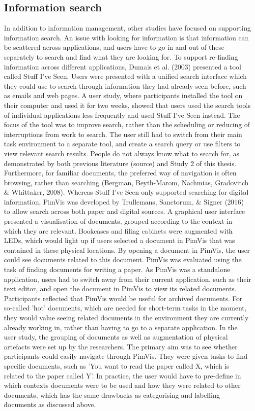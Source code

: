\subsection{Information search}
In addition to information management, other studies have focused on supporting information search. An issue with looking for information is that information can be scattered across applications, and users have to go in and out of these separately to search and find what they are looking for. To support re-finding information across different applications, Dumais et al. (2003) presented a tool called Stuff I've Seen. Users were presented with a unified search interface which they could use to search through information they had already seen before, such as emails and web pages. A user study, where participants installed the tool on their computer and used it for two weeks, showed that users used the search tools of individual applications less frequently and used Stuff I've Seen instead. The focus of the tool was to improve search, rather than the scheduling or reducing of interruptions from work to search. The user still had to switch from their main task environment to a separate tool, and create a search query or use filters to view relevant search results. People do not always know what to search for, as demonstrated by both previous literature (source) and Study 2 of this thesis. Furthermore, for familiar documents, the preferred way of navigation is often browsing, rather than searching (Bergman, Beyth-Marom, Nachmias, Gradovitch \& Whittaker, 2008).
Whereas Stuff I've Seen only supported searching for digital information, PimVis was developed by Trullemans, Sanctorum, \& Signer (2016) to allow search across both paper and digital sources. A graphical user interface presented a visualisation of documents, grouped according to the context in which they are relevant. Bookcases and filing cabinets were augmented with LEDs, which would light up if users selected a document in PimVis that was contained in these physical locations. By opening a document in PimVis, the user could see documents related to this document. PimVis was evaluated using the task of finding documents for writing a paper. As PimVis was a standalone application, users had to switch away from their current application, such as their text editor, and open the document in PimVis to view its related documents. Participants reflected that PimVis would be useful for archived documents. For so-called 'hot' documents, which are needed for short-term tasks in the moment, they would value seeing related documents in the environment they are currently already working in, rather than having to go to a separate application. In the user study, the grouping of documents as well as augmentation of physical artefacts were set up by the researchers. The primary aim was to see whether participants could easily navigate through PimVis. They were given tasks to find specific documents, such as 'You want to read the paper called X, which is related to the paper called Y'. In practice, the user would have to pre-define in which contexts documents were to be used and how they were related to other documents, which has the same drawbacks as categorising and labelling documents as discussed above.

